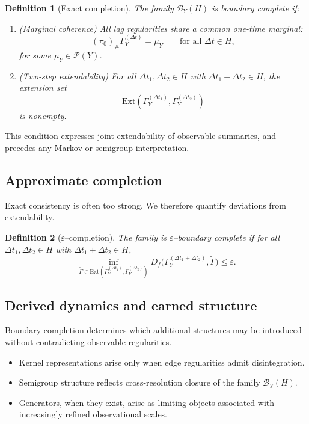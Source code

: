 \documentclass[11pt]{article}
\newtheorem{definition}{Definition}
\newcommand{\Ext}{\mathrm{Ext}} 	%
\begin{document}
\begin{definition}[Exact completion]\label{def:exact-boundary-completion}
The family $\mathcal B_Y(H)$ is \emph{boundary complete} if:
\begin{enumerate}
  \item (\emph{Marginal coherence}) All lag regularities share a common one-time marginal:
  \[
  (\pi_0)_\#\Gamma_Y^{(\Delta t)}=\mu_Y
  \qquad\text{for all }\Delta t\in H,
  \]
  for some $\mu_Y\in\mathcal P(Y)$.
  \item (\emph{Two-step extendability}) For all $\Delta t_1,\Delta t_2\in H$ with
  $\Delta t_1+\Delta t_2\in H$, the extension set
  \[
  \Ext(\Gamma_Y^{(\Delta t_1)},\Gamma_Y^{(\Delta t_2)})
  \]
  is nonempty.
\end{enumerate}
\end{definition}

This condition expresses joint extendability of observable summaries, and precedes any Markov
or semigroup interpretation.

\subsection{Approximate completion}
\label{subsec:approx-boundary-completion}

Exact consistency is often too strong. We therefore quantify deviations from extendability.

\begin{definition}[$\varepsilon$--completion]\label{def:eps-boundary-completion}
The family is $\varepsilon$--boundary complete if for all $\Delta t_1,\Delta t_2\in H$ with
$\Delta t_1+\Delta t_2\in H$,
\[
\inf_{\widetilde\Gamma\in\Ext(\Gamma_Y^{(\Delta t_1)},\Gamma_Y^{(\Delta t_2)})}
D_f\!\bigl(\Gamma_Y^{(\Delta t_1+\Delta t_2)},\widetilde\Gamma\bigr)
\le \varepsilon.
\]
\end{definition}

\subsection{Derived dynamics and earned structure}

Boundary completion determines which additional structures may be introduced
without contradicting observable regularities.

\begin{itemize}
  \item Kernel representations arise only when edge regularities admit
  disintegration.

  \item Semigroup structure reflects cross-resolution closure of the family
  $\mathcal B_Y(H)$.

  \item Generators, when they exist, arise as limiting objects associated with
  increasingly refined observational scales.
\end{itemize}
\end{document}
